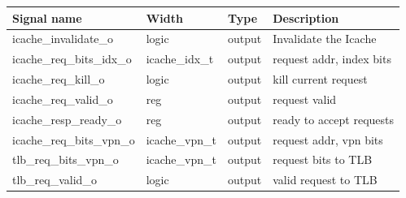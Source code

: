 \begin{table}[H]
	\centering
	\begin{tabular}{llll}
		\textbf{Signal name} & \textbf{Width} & \textbf{Type} & \textbf{Description} \\
		\hline
		icache\_invalidate\_o & logic & output & Invalidate the Icache \\
		icache\_req\_bits\_idx\_o & icache\_idx\_t & output & request addr, index bits \\
		icache\_req\_kill\_o & logic & output & kill current request \\
		icache\_req\_valid\_o & reg & output & request valid \\
		icache\_resp\_ready\_o & reg & output & ready to accept requests \\
		icache\_req\_bits\_vpn\_o & icache\_vpn\_t & output & request addr, vpn bits \\
		tlb\_req\_bits\_vpn\_o & icache\_vpn\_t & output & request bits to TLB \\
		tlb\_req\_valid\_o & logic & output & valid request to TLB \\
		
	\end{tabular}
\end{table}



